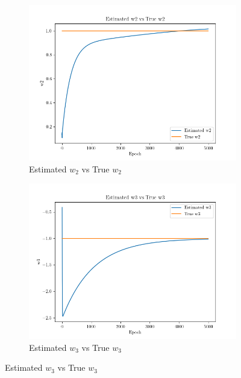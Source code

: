 \documentclass[a4paper]{article}
\begin{document}
\begin{enumerate}
\begin{figure}[H]
		      \begin{subfigure}{0.4\textwidth}
			      \centering
			      \includegraphics[width=\linewidth]{../Graph/Estimated-True-w2.png}
			      \caption{Estimated $w_2$ vs True $w_2$}
			      \label{fig:question8c}
		      \end{subfigure}
		      \hfill
		      \begin{subfigure}{0.4\textwidth}
			      \centering
			      \includegraphics[width=\linewidth]{../Graph/Estimated-True-w3.png}
			      \caption{Estimated $w_3$ vs True $w_3$}
			      \label{fig:question8d}
		      \end{subfigure}


\end{figure}
\end{enumerate}
\end{document}
